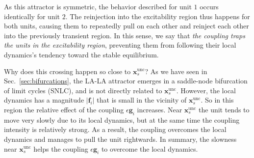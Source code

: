 As this attractor is symmetric, the behavior described for unit $1$ occurs identically for unit $2$. The reinjection into the excitability region thus happens for both units, causing them to repeatedly pull on each other and reinject each other into the previously transient region. In this sense, we say that \textit{the coupling traps the units in the excitability region}, preventing them from following their local dynamics's tendency toward the stable equilibrium.

Why does this crossing happen so close to $\mathbf{x}_s^\mathrm{unc}$? As we have seen in Sec.~\ref{sec:bifurcations}, the LA-LA attractor emerges in a saddle-node bifurcation of limit cycles (SNLC), and is not directly related to $\mathbf{x}_s^\mathrm{unc}$. However, the local dynamics has a magnitude $|\mathbf{f}_i|$ that is small in the vicinity of $\mathbf{x}_s^\mathrm{unc}$. So in this region the relative effect of the coupling $\epsilon \mathbf{g}_i$ increases. Near $\mathbf{x}_s^\mathrm{unc}$ the unit tends to move very slowly due to its local dynamics, but at the same time the coupling intensity is relatively strong. As a result, the coupling overcomes the local dynamics and manages to pull the unit rightwards. In summary, the slowness near $\mathbf{x}_s^\mathrm{unc}$ helps the coupling $\epsilon \mathbf{g}_i$ to overcome the local dynamics. %

